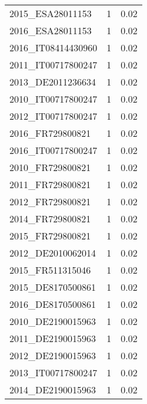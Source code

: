 \begin{table*}[htbp]
\begin{tabular}{lrr}
2015_ESA28011153 & 1 & 0.02 \\
2016_ESA28011153 & 1 & 0.02 \\
2016_IT08414430960 & 1 & 0.02 \\
2011_IT00717800247 & 1 & 0.02 \\
2013_DE2011236634 & 1 & 0.02 \\
2010_IT00717800247 & 1 & 0.02 \\
2012_IT00717800247 & 1 & 0.02 \\
2016_FR729800821 & 1 & 0.02 \\
2016_IT00717800247 & 1 & 0.02 \\
2010_FR729800821 & 1 & 0.02 \\
2011_FR729800821 & 1 & 0.02 \\
2012_FR729800821 & 1 & 0.02 \\
2014_FR729800821 & 1 & 0.02 \\
2015_FR729800821 & 1 & 0.02 \\
2012_DE2010062014 & 1 & 0.02 \\
2015_FR511315046 & 1 & 0.02 \\
2015_DE8170500861 & 1 & 0.02 \\
2016_DE8170500861 & 1 & 0.02 \\
2010_DE2190015963 & 1 & 0.02 \\
2011_DE2190015963 & 1 & 0.02 \\
2012_DE2190015963 & 1 & 0.02 \\
2013_IT00717800247 & 1 & 0.02 \\
2014_DE2190015963 & 1 & 0.02 \\
\bottomrule
\end{tabular}
\end{table*}
